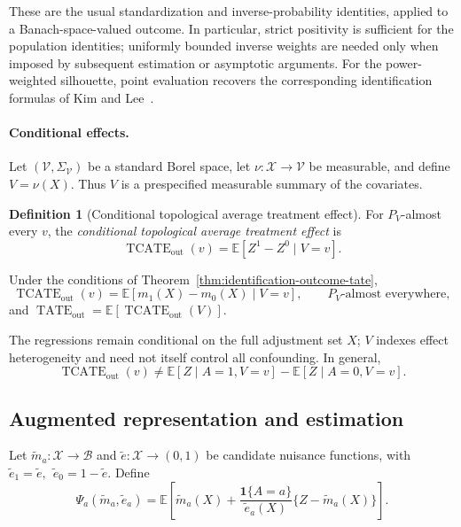 \documentclass[11pt,a4paper]{article}
\theoremstyle{plain}
\theoremstyle{definition}
\newtheorem{definition}[theorem]{Definition}
\theoremstyle{remark}
\newcommand{\1}{\mathbbm{1}}
\begin{document}
These are the usual standardization and inverse-probability identities, applied to a Banach-space-valued outcome. In particular, strict positivity is sufficient for the population identities; uniformly bounded inverse weights are needed only when imposed by subsequent estimation or asymptotic arguments. For the power-weighted silhouette,
point evaluation recovers the corresponding identification formulas of Kim and Lee~\citep{kimlee2026}.

\paragraph{Conditional effects.}
Let \((\mathcal V,\Sigma_{\mathcal V})\) be a standard Borel space, let
\(\nu:\mathcal X\to\mathcal V\) be measurable, and define
\(V=\nu(X)\). Thus \(V\) is a prespecified measurable summary of the covariates.

\begin{definition}[Conditional topological average treatment effect]
\label{def:tcate}
For \(P_V\)-almost every \(v\), the \emph{conditional topological average treatment effect} is
\[
\operatorname{TCATE}_{\mathrm{out}}(v)
=
\mathbb E[Z^1-Z^0\mid V=v].
\]
\end{definition}

Under the conditions of Theorem~\ref{thm:identification-outcome-tate},
\[
\operatorname{TCATE}_{\mathrm{out}}(v)
=
\mathbb E[m_1(X)-m_0(X)\mid V=v],
\qquad P_V\text{-almost everywhere},
\]
and
\(\operatorname{TATE}_{\mathrm{out}} = \mathbb E\!\left[
\operatorname{TCATE}_{\mathrm{out}}(V)\right]\).

The regressions remain conditional on the full adjustment set \(X\); \(V\) indexes effect heterogeneity and need not itself control all confounding. In general,
\[
\operatorname{TCATE}_{\mathrm{out}}(v)
\neq
\mathbb E[Z\mid A=1,V=v]
-
\mathbb E[Z\mid A=0,V=v].
\]

\subsection{Augmented representation and estimation}
\label{subsec:aipw-outcome}

Let \(\widetilde m_a:\mathcal X\to\mathcal B\) and
\(\widetilde e:\mathcal X\to(0,1)\) be candidate nuisance functions, with \(\widetilde e_1=\widetilde e, \ \ \widetilde e_0=1-\widetilde e\). Define
\[
\Psi_a(\widetilde m_a,\widetilde e_a)
=
\mathbb E\left[
\widetilde m_a(X)
+
\frac{\mathbf 1\{A=a\}}{\widetilde e_a(X)}
\{Z-\widetilde m_a(X)\}
\right].
\]
\end{document}
